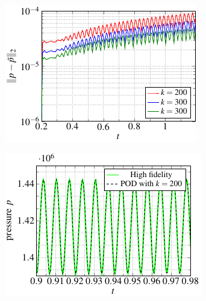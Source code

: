 \begin{figure}
  \begin{subfigure}[]{0.48\linewidth}
      \includegraphics[scale=1]{Figures/paper-figure27.pdf}
  \caption{} \label{fig:5p2.2c}
  \label{error_growth_comb}
  \end{subfigure}\hfill%
  \begin{subfigure}[]{0.48\linewidth}
    \includegraphics[scale=1]{Figures/paper-figure28.pdf}

\end{subfigure}
\end{figure}
